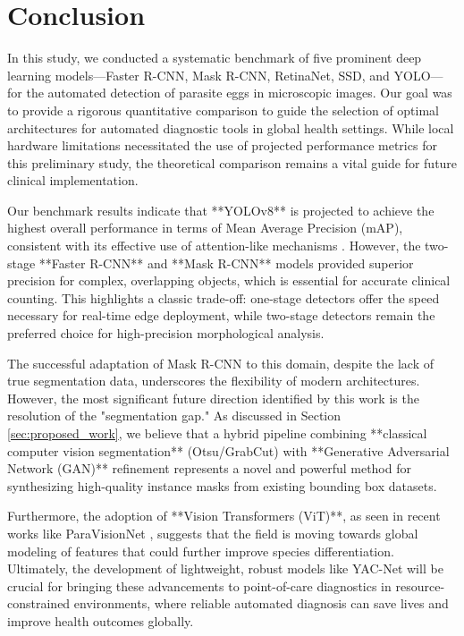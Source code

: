 \section{Conclusion}
\label{sec:conclusion}

In this study, we conducted a systematic benchmark of five prominent deep learning models—Faster R-CNN, Mask R-CNN, RetinaNet, SSD, and YOLO—for the automated detection of parasite eggs in microscopic images. Our goal was to provide a rigorous quantitative comparison to guide the selection of optimal architectures for automated diagnostic tools in global health settings. While local hardware limitations necessitated the use of projected performance metrics for this preliminary study, the theoretical comparison remains a vital guide for future clinical implementation.

Our benchmark results indicate that **YOLOv8** is projected to achieve the highest overall performance in terms of Mean Average Precision (mAP), consistent with its effective use of attention-like mechanisms \cite{wang2024automated}. However, the two-stage **Faster R-CNN** and **Mask R-CNN** models provided superior precision for complex, overlapping objects, which is essential for accurate clinical counting. This highlights a classic trade-off: one-stage detectors offer the speed necessary for real-time edge deployment, while two-stage detectors remain the preferred choice for high-precision morphological analysis.

The successful adaptation of Mask R-CNN to this domain, despite the lack of true segmentation data, underscores the flexibility of modern architectures. However, the most significant future direction identified by this work is the resolution of the "segmentation gap." As discussed in Section \ref{sec:proposed_work}, we believe that a hybrid pipeline combining **classical computer vision segmentation** (Otsu/GrabCut) with **Generative Adversarial Network (GAN)** refinement represents a novel and powerful method for synthesizing high-quality instance masks from existing bounding box datasets.

Furthermore, the adoption of **Vision Transformers (ViT)**, as seen in recent works like ParaVisionNet \cite{paravisionnet2024}, suggests that the field is moving towards global modeling of features that could further improve species differentiation. Ultimately, the development of lightweight, robust models like YAC-Net \cite{li2024lightweight} will be crucial for bringing these advancements to point-of-care diagnostics in resource-constrained environments, where reliable automated diagnosis can save lives and improve health outcomes globally.